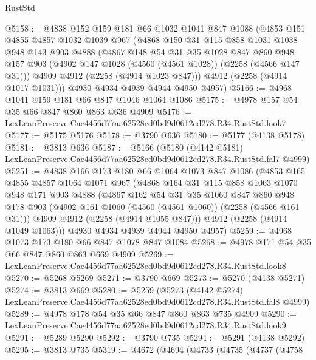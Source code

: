 \begin{lexlean}{RustStd}
\begin{coremodule}
@5158 := @4838
    @152
    @159
    @181
    @66
    @1032
    @1041
    @847
    @1088
    (@4853
      @151
      @4855
      @4857
      @1032
      @1039
      @967
      (@4868
        @150
        @31
        @115
        @858
        @1031
        @1038
        @948
        @143
        @903
        @4888
        (@4867
          @148
          @54
          @31
          @35
          @1028
          @847
          @860
          @948
          @157
          @903
          (@4902 @147 @1028 (@4560 (@4561 @1028)) (@2258 (@4566 @147 @31)))
          @4909
          @4912
          (@2258 (@4914 @1023 @847)))
        @4912
        (@2258 (@4914 @1017 @1031)))
      @4930
      @4934
      @4939
      @4944
      @4950
      @4957)
@5166 := @4968 @1041 @159 @181 @66 @847 @1046 @1064 @1086
@5175 := @4978 @157 @54 @35 @66 @847 @860 @863 @636 @4909
@5176 := LexLeanPreserve.Cae4456d77aa62528ed0bd9d0612cd278.R34.RustStd.look7
@5177 := @5175 @5176
@5178 := @3790 @636
@5180 := @5177 (@4138 @5178)
@5181 := @3813 @636
@5187 := @5166
    (@5180 (@4142 @5181) LexLeanPreserve.Cae4456d77aa62528ed0bd9d0612cd278.R34.RustStd.fal7 @4999)
@5251 := @4838
    @166
    @173
    @180
    @66
    @1064
    @1073
    @847
    @1086
    (@4853
      @165
      @4855
      @4857
      @1064
      @1071
      @967
      (@4868
        @164
        @31
        @115
        @858
        @1063
        @1070
        @948
        @171
        @903
        @4888
        (@4867
          @162
          @54
          @31
          @35
          @1060
          @847
          @860
          @948
          @178
          @903
          (@4902 @161 @1060 (@4560 (@4561 @1060)) (@2258 (@4566 @161 @31)))
          @4909
          @4912
          (@2258 (@4914 @1055 @847)))
        @4912
        (@2258 (@4914 @1049 @1063)))
      @4930
      @4934
      @4939
      @4944
      @4950
      @4957)
@5259 := @4968 @1073 @173 @180 @66 @847 @1078 @847 @1084
@5268 := @4978 @171 @54 @35 @66 @847 @860 @863 @669 @4909
@5269 := LexLeanPreserve.Cae4456d77aa62528ed0bd9d0612cd278.R34.RustStd.look8
@5270 := @5268 @5269
@5271 := @3790 @669
@5273 := @5270 (@4138 @5271)
@5274 := @3813 @669
@5280 := @5259
    (@5273 (@4142 @5274) LexLeanPreserve.Cae4456d77aa62528ed0bd9d0612cd278.R34.RustStd.fal8 @4999)
@5289 := @4978 @178 @54 @35 @66 @847 @860 @863 @735 @4909
@5290 := LexLeanPreserve.Cae4456d77aa62528ed0bd9d0612cd278.R34.RustStd.look9
@5291 := @5289 @5290
@5292 := @3790 @735
@5294 := @5291 (@4138 @5292)
@5295 := @3813 @735
@5319 := @4672
    (@4694
      (@4733
        (@4735
          (@4737
            (@4758

\end{coremodule}
\end{lexlean}
